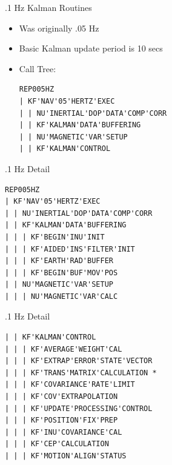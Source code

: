 \begin{frame}
.1 Hz Kalman Routines
\begin{itemize}
\item Was originally .05 Hz
\item Basic Kalman update period is 10 secs
\item Call Tree:
\begin{verbatim}
REP005HZ
| KF'NAV'05'HERTZ'EXEC
| | NU'INERTIAL'DOP'DATA'COMP'CORR
| | KF'KALMAN'DATA'BUFFERING
| | NU'MAGNETIC'VAR'SETUP
| | KF'KALMAN'CONTROL
\end{verbatim}
\end{itemize}
\end{frame}
\begin{frame}
.1 Hz Detail
\begin{verbatim}
REP005HZ
| KF'NAV'05'HERTZ'EXEC
| | NU'INERTIAL'DOP'DATA'COMP'CORR
| | KF'KALMAN'DATA'BUFFERING
| | | KF'BEGIN'INU'INIT
| | | KF'AIDED'INS'FILTER'INIT 
| | | KF'EARTH'RAD'BUFFER
| | | KF'BEGIN'BUF'MOV'POS
| | NU'MAGNETIC'VAR'SETUP
| | | NU'MAGNETIC'VAR'CALC
\end{verbatim}
\end{frame}
\begin{frame}
.1 Hz Detail
\begin{verbatim}
| | KF'KALMAN'CONTROL
| | | KF'AVERAGE'WEIGHT'CAL
| | | KF'EXTRAP'ERROR'STATE'VECTOR
| | | KF'TRANS'MATRIX'CALCULATION *
| | | KF'COVARIANCE'RATE'LIMIT
| | | KF'COV'EXTRAPOLATION
| | | KF'UPDATE'PROCESSING'CONTROL
| | | KF'POSITION'FIX'PREP
| | | KF'INU'COVARIANCE'CAL
| | | KF'CEP'CALCULATION
| | | KF'MOTION'ALIGN'STATUS
\end{verbatim}
\end{frame}
